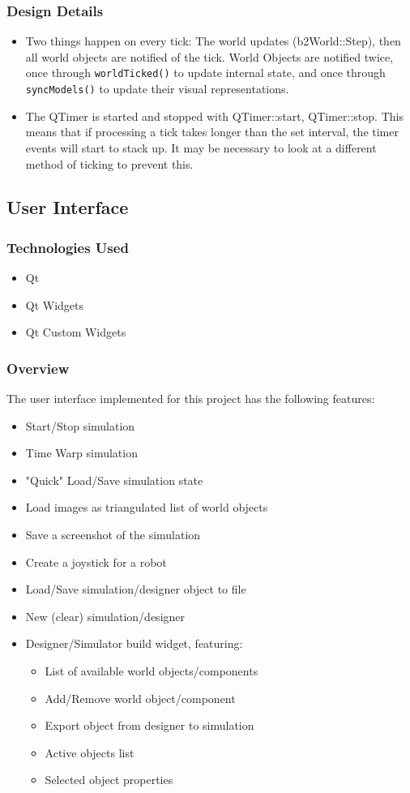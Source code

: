 \subsubsection*{Design Details}
\begin{itemize}
	\item Two things happen on every tick: The world updates (b2World::Step), then all world objects are notified of the tick. World Objects are notified twice, once through \lstinline|worldTicked()| to update internal state, and once through \lstinline|syncModels()| to update their visual representations.
	\item The QTimer is started and stopped with QTimer::start, QTimer::stop. This means that if processing a tick takes longer than the set interval, the timer events will start to stack up. It may be necessary to look at a different method of ticking to prevent this.
\end{itemize}

\subsection{User Interface}
\subsubsection*{Technologies Used}
\begin{itemize}
	\item Qt
	\item Qt Widgets
	\item Qt Custom Widgets
\end{itemize}
\subsubsection*{Overview}
The user interface implemented for this project has the following features:
\begin{itemize}
	\item Start/Stop simulation
	\item Time Warp simulation
	\item "Quick" Load/Save simulation state
	\item Load images as triangulated list of world objects
	\item Save a screenshot of the simulation
	\item Create a joystick for a robot
	\item Load/Save simulation/designer object to file
	\item New (clear) simulation/designer
	\item Designer/Simulator build widget, featuring:
	\begin{itemize}
		\item List of available world objects/components
		\item Add/Remove world object/component
		\item Export object from designer to simulation
		\item Active objects list
		\item Selected object properties
	\end{itemize}
\end{itemize}

